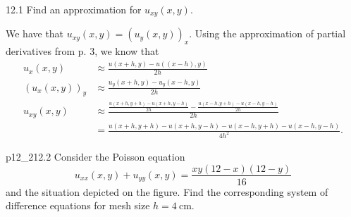 
\begin{problem}{12.1}
  Find an approximation for $u_{xy}(x,y)$.
\end{problem}

\begin{derivation}
  We have that $u_{xy}(x,y) = (u_y(x,y))_x$.
  Using the approximation of partial derivatives from p. 3, we know that
  \begin{align*}
    u_x(x,y) &\approx \frac{u(x+h, y) - u((x-h), y)}{2h} \\
    \left( u_x(x,y) \right)_y &\approx \frac{u_y(x+h,y) - u_y(x-h, y)}{2h} \\
    u_{xy}(x,y) &\approx \frac{\frac{u(x+h, y+h) - u(x+h,y-h)}{2h} - \frac{u(x-h, y+h) - u(x-h, y-h)}{2h}}{2h} \\
                &= \frac{u(x+h, y+h) - u(x+h, y-h) - u(x-h, y+h) - u(x-h, y-h)}{4h^2}
  .\end{align*}
\end{derivation}


\begin{problemwithimage}{p12_2}{12.2}
    Consider the Poisson equation
  \begin{equation*}
    u_{x x}(x,y) + u_{yy}(x,y) = \frac{xy(12-x)(12-y)}{16}
  \end{equation*}
  and the situation depicted on the figure.
  Find the corresponding system of difference equations for mesh size $h = \qty{4}{\cm}$.
\end{problemwithimage}

